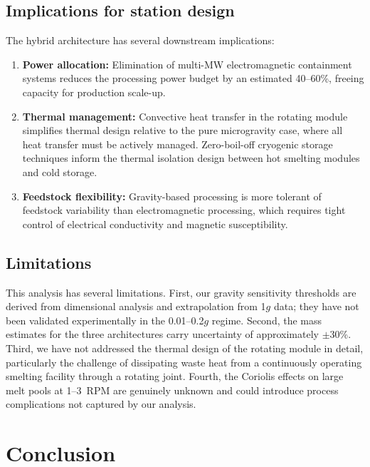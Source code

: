 \documentclass[preprint,12pt]{elsarticle}
\begin{document}
\subsection{Implications for station design}

The hybrid architecture has several downstream implications:

\begin{enumerate}
    \item \textbf{Power allocation:} Elimination of multi-MW electromagnetic containment systems reduces the processing power budget by an estimated 40--60\%, freeing capacity for production scale-up.
    \item \textbf{Thermal management:} Convective heat transfer in the rotating module simplifies thermal design relative to the pure microgravity case, where all heat transfer must be actively managed. Zero-boil-off cryogenic storage techniques \cite{plachta2016} inform the thermal isolation design between hot smelting modules and cold storage.
    \item \textbf{Feedstock flexibility:} Gravity-based processing is more tolerant of feedstock variability than electromagnetic processing, which requires tight control of electrical conductivity and magnetic susceptibility.
\end{enumerate}

\subsection{Limitations}

This analysis has several limitations. First, our gravity sensitivity thresholds are derived from dimensional analysis and extrapolation from 1$g$ data; they have not been validated experimentally in the 0.01--0.2$g$ regime. Second, the mass estimates for the three architectures carry uncertainty of approximately $\pm$30\%. Third, we have not addressed the thermal design of the rotating module in detail, particularly the challenge of dissipating waste heat from a continuously operating smelting facility through a rotating joint. Fourth, the Coriolis effects on large melt pools at 1--3~RPM are genuinely unknown and could introduce process complications not captured by our analysis.

\section{Conclusion}
\label{sec:conclusion}
\end{document}
